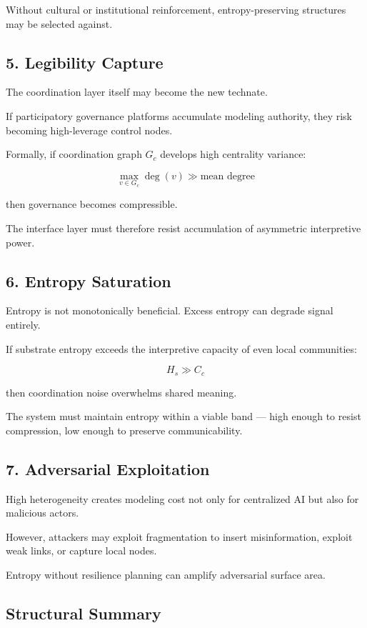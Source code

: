 \documentclass[12pt]{article}
\begin{document}
Without cultural or institutional reinforcement, entropy-preserving structures may be selected against.

\subsection*{5. Legibility Capture}

The coordination layer itself may become the new technate.

If participatory governance platforms accumulate modeling authority, they risk becoming high-leverage control nodes.

Formally, if coordination graph $G_c$ develops high centrality variance:

\[
\max_{v \in G_c} \deg(v) \gg \text{mean degree}
\]

then governance becomes compressible.

The interface layer must therefore resist accumulation of asymmetric interpretive power.

\subsection*{6. Entropy Saturation}

Entropy is not monotonically beneficial. Excess entropy can degrade signal entirely.

If substrate entropy exceeds the interpretive capacity of even local communities:

\[
H_s \gg C_c
\]

then coordination noise overwhelms shared meaning.

The system must maintain entropy within a viable band — high enough to resist compression, low enough to preserve communicability.

\subsection*{7. Adversarial Exploitation}

High heterogeneity creates modeling cost not only for centralized AI but also for malicious actors.

However, attackers may exploit fragmentation to insert misinformation, exploit weak links, or capture local nodes.

Entropy without resilience planning can amplify adversarial surface area.

\subsection*{Structural Summary}
\end{document}
